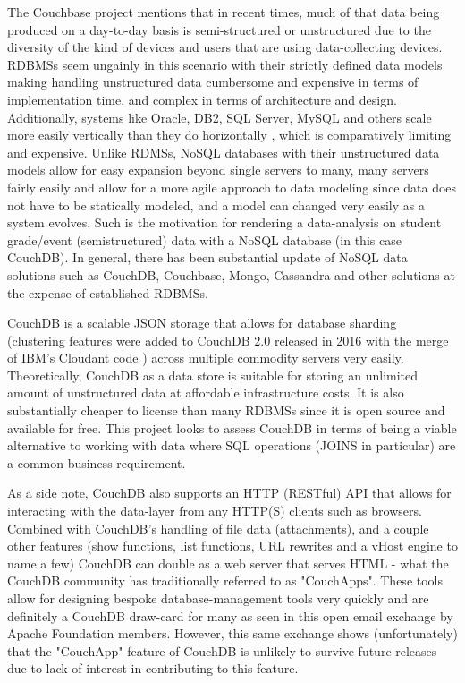 The Couchbase project \cite{couchbaseWhitePaper} mentions that in recent times, much of that data being produced on a day-to-day basis is semi-structured or unstructured due to the diversity of the kind of devices and users that are using data-collecting devices. RDBMSs seem ungainly in this scenario with their strictly defined data models making handling unstructured data cumbersome and expensive in terms of implementation time, and complex in terms of architecture and design. Additionally, systems like Oracle, DB2, SQL Server, MySQL and others scale more easily vertically than they do horizontally \cite{couchbaseWhitePaper}, which is comparatively limiting and expensive. Unlike RDMSs, NoSQL databases with their unstructured data models allow for easy expansion beyond single servers to many, many servers fairly easily and allow for a more agile approach to data modeling since data does not have to be statically modeled, and a model can changed very easily as a system evolves. Such is the motivation for rendering a data-analysis on student grade/event (semistructured) data with a NoSQL database (in this case CouchDB). In general, there has been substantial update of NoSQL data solutions such as CouchDB, Couchbase, Mongo, Cassandra and other solutions at the expense of established RDBMSs.

CouchDB is a scalable JSON storage that allows for database sharding (clustering features were added to CouchDB 2.0 released in 2016 with the merge of IBM's Cloudant code \cite{couchdb2.0}) across multiple commodity servers very easily. Theoretically, CouchDB as a data store is suitable for storing an unlimited amount of unstructured data at affordable infrastructure costs. It is also substantially cheaper to license than many RDBMSs since it is open source and available for free. This project looks to assess CouchDB in terms of being a viable alternative to working with data where SQL operations (JOINS in particular) are a common business requirement.

As a side note, CouchDB also supports an HTTP (RESTful) API that allows for interacting with the data-layer from any HTTP(S) clients such as browsers. Combined with CouchDB's handling of file data (attachments), and a couple other features (show functions, list functions, URL rewrites and a vHost engine to name a few) CouchDB can double as a web server that serves HTML - what the CouchDB community has traditionally referred to as "CouchApps". These tools allow for designing bespoke database-management tools very quickly and are definitely a CouchDB draw-card for many as seen in this open email exchange \cite{googleCon2017} by Apache Foundation members. However, this same exchange shows (unfortunately) that the "CouchApp" feature of CouchDB is unlikely to survive future releases due to lack of interest in contributing to this feature.

